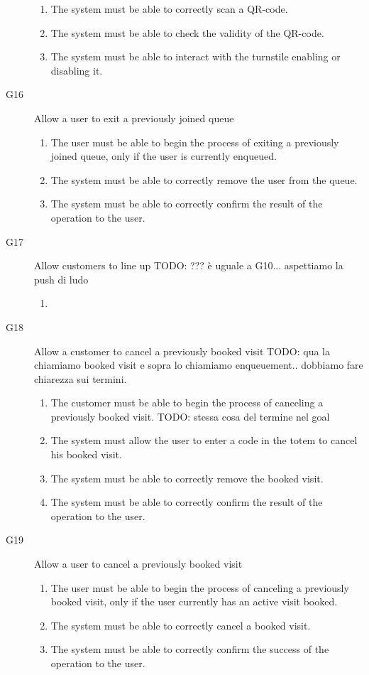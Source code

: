\begin{description}
\begin{enumerate}[resume*]
            \item The system must be able to correctly scan a QR-code.
            \item The system must be able to check the validity of the QR-code.
            \item The system must be able to interact with the turnstile enabling or disabling it.
        \end{enumerate}
    \item [G16] Allow a user to exit a previously joined queue
        \begin{enumerate}[resume*]
            \item The user must be able to begin the process of exiting a previously joined queue, only if the user is currently enqueued.
            \item The system must be able to correctly remove the user from the queue.
            \item The system must be able to correctly confirm the result of the operation to the user.
        \end{enumerate}
    \item [G17] Allow customers to line up TODO: ??? è uguale a G10... aspettiamo la push di ludo
        \begin{enumerate}[resume*]
            \item 
        \end{enumerate}
    \item [G18] Allow a customer to cancel a previously booked visit TODO: qua la chiamiamo booked visit e sopra lo chiamiamo enqueuement.. dobbiamo fare chiarezza sui termini.
        \begin{enumerate}[resume*]
            \item The customer must be able to begin the process of canceling a previously booked visit. TODO: stessa cosa del termine nel goal
            \item The system must allow the user to enter a code in the totem to cancel his booked visit.
            \item The system must be able to correctly remove the booked visit.
            \item The system must be able to correctly confirm the result of the operation to the user.
        \end{enumerate}
    \item [G19] Allow a user to cancel a previously booked visit
        \begin{enumerate}[resume*]
            \item The user must be able to begin the process of canceling a previously booked visit, only if the user currently has an active visit booked.
            \item The system must be able to correctly cancel a booked visit.
            \item The system must be able to correctly confirm the success of the operation to the user.
        \end{enumerate}
\end{description}

